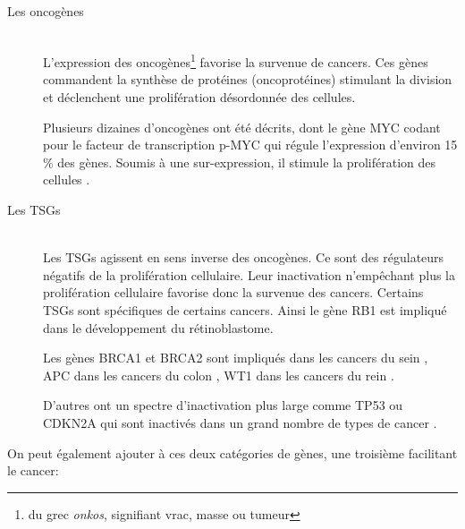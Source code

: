 			\begin{description}
				\item [Les oncogènes] \hfill \\
					L'expression des oncogènes\footnote{du grec \emph{onkos}, signifiant vrac, masse ou tumeur} favorise la survenue de cancers.
					Ces gènes commandent la synthèse de protéines (oncoprotéines) stimulant la division et déclenchent une prolifération désordonnée des cellules.

					Plusieurs dizaines d'oncogènes ont été décrits, dont le gène \acs{MYC} codant pour le facteur de transcription \acs{p-MYC} qui régule l'expression d'environ 15 \% des gènes.
					Soumis à une sur-expression, il stimule la prolifération des cellules \citep{Li2003}.

				\item [Les \acp{TSG}] \hfill \\
					Les \acp{TSG} agissent en sens inverse des oncogènes.
					Ce sont des régulateurs négatifs de la prolifération cellulaire.
					Leur inactivation n'empêchant plus la prolifération cellulaire favorise donc la survenue des cancers.
					Certains \acp{TSG} sont spécifiques de certains cancers.
					Ainsi le gène \acs{RB1} est impliqué dans le développement du rétinoblastome.

					Les gènes \acs{BRCA1} et \acs{BRCA2} sont impliqués dans les cancers du sein \citep{Hall1990}, \acs{APC} dans les cancers du colon \citep{Nishisho1991}, \acs{WT1} dans les cancers du rein \citep{Little1992}.

					D'autres ont un spectre d'inactivation plus large comme \acs{TP53} ou \acs{CDKN2A} qui sont inactivés dans un grand nombre de types de cancer \citep{Caldas1994,Jiang2011,Wang2011a,Piao2011,Alawadi2011,Sonoyama2011,Igaki1994}.

			\end{description}
			\vspace{1.5ex}

			On peut également ajouter à ces deux catégories de gènes, une troisième facilitant le cancer:

